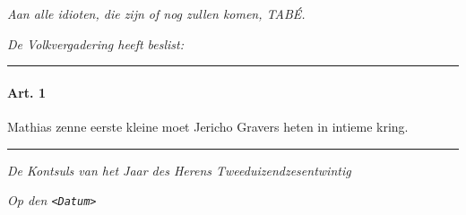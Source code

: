 \emph{Aan alle idioten, die zijn of nog zullen komen, TABÉ.}

\emph{De Volkvergadering heeft beslist:}

\begin{center}\rule{0.5\linewidth}{0.5pt}\end{center}

\hypertarget{art.-1}{%
\paragraph{Art. 1}\label{art.-1}}

Mathias zenne eerste kleine moet Jericho Gravers heten in intieme kring.

\begin{center}\rule{0.5\linewidth}{0.5pt}\end{center}

\emph{De Kontsuls van het Jaar des Herens Tweeduizendzesentwintig}

\emph{Op den \texttt{\textless{}Datum\textgreater{}}}
